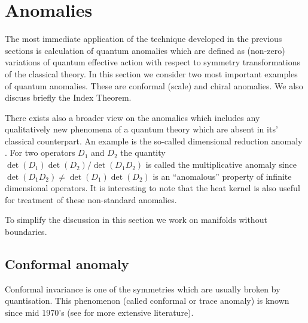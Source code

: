 \section{Anomalies} \label{sec7}
The most immediate application of the technique
developed in the previous sections is calculation of
quantum anomalies which are defined as (non-zero) variations of
quantum effective action with respect to symmetry transformations
of the classical theory. In this section we consider two most
important examples of quantum anomalies. These are conformal (scale)
and chiral anomalies. We also discuss briefly the Index Theorem.


There exists also a broader view on the
anomalies which includes any qualitatively new phenomena of a quantum
theory which are absent in its' classical counterpart. An example is the
so-called dimensional reduction anomaly \cite{Frolov:1999an}.
For two operators $D_1$ and $D_2$ the quantity $\det (D_1) \det (D_2)/
\det (D_1D_2)$ is called the multiplicative anomaly 
\cite{Elizalde:1998nd}
since $\det (D_1D_2)\ne \det (D_1)\det(D_2)$  is an ``anomalous''
property of infinite dimensional operators. It is interesting to note
that the heat kernel is also useful for treatment of these non-standard
anomalies. 

To simplify the discussion in this section we work on manifolds without
boundaries.  
\subsection{Conformal anomaly}\label{s7conf}
Conformal invariance is one of the symmetries which are usually broken
by quantisation. This phenomenon (called conformal or trace anomaly)
is known since mid 1970's 
\cite{Capper:1974ic,Deser:1976yx,Dowker:1976tf,Brown:1977pq,Tsao:1977tj}
(see \cite{Birrell:1982ix,Duff:1994wm} for more extensive literature).

